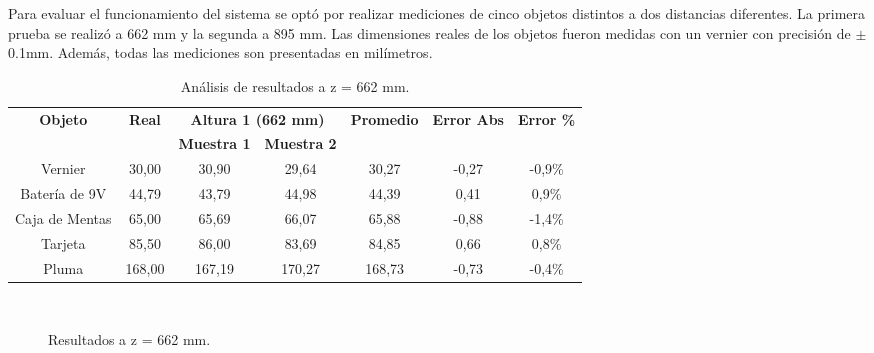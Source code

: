 \documentclass[]{article}
\begin{document}
Para evaluar el funcionamiento del sistema se optó por realizar mediciones de cinco objetos distintos a dos distancias diferentes. La primera prueba se realizó a 662 mm y la segunda a 895 mm. Las dimensiones reales de los objetos fueron medidas con un vernier con precisión de $\pm$ 0.1mm. Además, todas las mediciones son presentadas en milímetros.

\begin{table}[H]
	\centering
	\begin{tabular}{|c|c|c|c|c|c|c|}
		\hline
		\multirow{2}{*}{\textbf{Objeto}} & \multirow{2}{*}{\textbf{Real}} & \multicolumn{2}{c|}{\textbf{Altura 1 (662 mm)}} & \multirow{2}{*}{\textbf{Promedio}} & \multirow{2}{*}{\textbf{Error Abs}} & \multirow{2}{*}{\textbf{Error \%}} \\ \cline{3-4}
		 &  & \textbf{Muestra 1} & \textbf{Muestra 2} &  &  &  \\ \hline
		Vernier & 30,00 & 30,90 & 29,64 & 30,27 & -0,27 & -0,9\% \\ \hline
		Batería de 9V & 44,79 & 43,79 & 44,98 & 44,39 & 0,41 & 0,9\% \\ \hline
		Caja de Mentas & 65,00 & 65,69 & 66,07 & 65,88 & -0,88 & -1,4\% \\ \hline
		Tarjeta & 85,50 & 86,00 & 83,69 & 84,85 & 0,66 & 0,8\% \\ \hline
		Pluma & 168,00 & 167,19 & 170,27 & 168,73 & -0,73 & -0,4\% \\ \hline
	\end{tabular}
	\label{table:resultados-1}
	\caption{Análisis de resultados a z = 662 mm.}
\end{table}

\begin{figure}[h]
	\centering
	\\
	\caption{Resultados a z = 662 mm.}
	\label{fig:resultados-1}
\end{figure}
\end{document}
